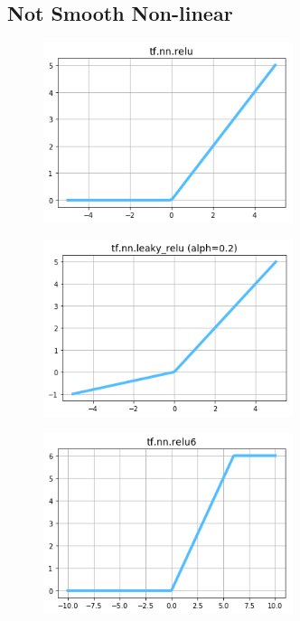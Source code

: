 
\subsection{Not Smooth Non-linear}

\begin{figure}
\centering
\includegraphics[width=0.65\textwidth]{./sync_imgs/act/notsmooth/relu.png}
\label{fig:act_notsmooth_relu}
\end{figure}

\begin{figure}
\centering
\includegraphics[width=0.65\textwidth]{./sync_imgs/act/notsmooth/leakyrelu.png}
\label{fig:act_notsmooth_leakyrelu}
\end{figure}

\begin{figure}
\centering
\includegraphics[width=0.65\textwidth]{./sync_imgs/act/notsmooth/relu6.png}
\label{fig:act_notsmooth_relu6}
\end{figure}

